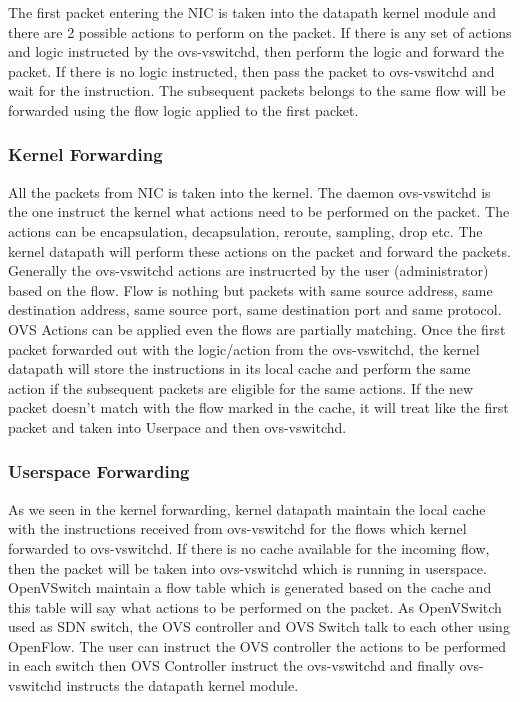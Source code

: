The first packet entering the NIC is taken into the datapath kernel module and there are 2 possible actions to perform on the packet. If there is any set of actions and logic instructed by the ovs-vswitchd, then perform the logic and forward the packet. If there is no logic instructed, then pass the packet to ovs-vswitchd and wait for the instruction. The subsequent packets belongs to the same flow will be forwarded using the flow logic applied to the first packet.



\subsubsection{Kernel Forwarding} 

All the packets from NIC is taken into the kernel. The daemon ovs-vswitchd is the one instruct the kernel what actions need to be performed on the packet. The actions can be encapsulation, decapsulation, reroute, sampling, drop etc. The kernel datapath will perform these actions on the packet and forward the packets. Generally the ovs-vswitchd actions are instrucrted by the user (administrator) based on the flow. Flow is nothing but packets with same source address, same destination address, same source port, same destination port and same protocol. OVS Actions can be applied even the flows are partially matching. Once the first packet forwarded out with the logic/action from the ovs-vswitchd, the kernel datapath will store the instructions in its local cache and perform the same action if the subsequent packets are eligible for the same actions. If the new packet doesn’t match with the flow marked in the cache, it will treat like the first packet and taken into Userpace and then ovs-vswitchd.


\subsubsection{Userspace Forwarding} 

As we seen in the kernel forwarding, kernel datapath maintain the local cache with the instructions received from ovs-vswitchd for the flows which kernel forwarded to  ovs-vswitchd. If there is no cache available for the incoming flow, then the packet will be taken into ovs-vswitchd which is running in userspace. OpenVSwitch maintain a flow table which is generated based on the cache and this table will say what actions to be performed on the packet. As OpenVSwitch used as SDN switch, the OVS controller and OVS Switch talk to each other using OpenFlow. The user can instruct the OVS controller the actions to be performed in each switch then  OVS Controller instruct the  ovs-vswitchd and finally ovs-vswitchd instructs the datapath kernel module. 

